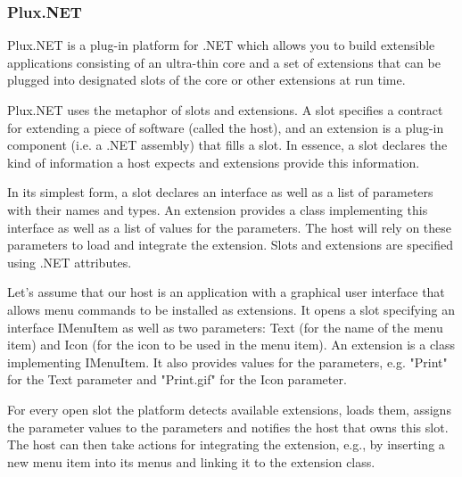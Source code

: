 \subsubsection{Plux.NET}

Plux.NET is a plug-in platform for .NET which allows you to build extensible applications consisting of an ultra-thin core and a set of extensions that can be plugged into designated slots of the core or other extensions at run time.

Plux.NET uses the metaphor of slots and extensions. A slot specifies a contract for extending a piece of software (called the host), and an extension is a plug-in component (i.e. a .NET assembly) that fills a slot. In essence, a slot declares the kind of information a host expects and extensions provide this information.

In its simplest form, a slot declares an interface as well as a list of parameters with their names and types. An extension provides a class implementing this interface as well as a list of values for the parameters. The host will rely on these parameters to load and integrate the extension. Slots and extensions are specified using .NET attributes.

Let's assume that our host is an application with a graphical user interface that allows menu commands to be installed as extensions. It opens a slot specifying an interface IMenuItem as well as two parameters: Text (for the name of the menu item) and Icon (for the icon to be used in the menu item). An extension is a class implementing IMenuItem. It also provides values for the parameters, e.g. "Print" for the Text parameter and "Print.gif" for the Icon parameter.

For every open slot the platform detects available extensions, loads them, assigns the parameter values to the parameters and notifies the host that owns this slot. The host can then take actions for integrating the extension, e.g., by inserting a new menu item into its menus and linking it to the extension class.